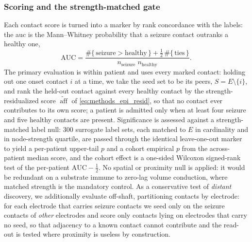 \subsubsection{Scoring and the strength-matched gate}
\label{sssec:methods_epi_gate}
Each contact score is turned into a marker by rank concordance with the labels: the \gls{auc} is the Mann--Whitney probability that a seizure contact outranks a healthy one,
\begin{equation}
    \mathrm{AUC} = \frac{\#\{\,\text{seizure}>\text{healthy}\,\} + \tfrac12\,\#\{\,\text{ties}\,\}}{n_{\text{seizure}}\;n_{\text{healthy}}}.
    \label{eq:methods_epi_auc}
\end{equation}
The primary evaluation is within patient and uses every marked contact: holding out one onset contact \(i\) at a time, we take the seed set to be its peers, \(S = E\setminus\{i\}\), and rank the held-out contact against every healthy contact by the strength-residualized score \(\widetilde{\operatorname{aff}}\) of \eqref{eq:methods_epi_resid}, so that no contact ever contributes to its own score; a patient is admitted only when at least four seizure and five healthy contacts are present. Significance is assessed against a strength-matched label null: \num{300} surrogate label sets, each matched to \(E\) in cardinality and in node-strength quartile, are passed through the identical leave-one-out marker to yield a per-patient upper-tail \(p\) and a cohort empirical \(p\) from the across-patient median score, and the cohort effect is a one-sided Wilcoxon signed-rank test of the per-patient \(\mathrm{AUC}-\tfrac12\). No spatial or proximity null is applied: it would be redundant on a substrate immune to zero-lag volume conduction, where matched strength is the mandatory control. As a conservative test of \emph{distant} discovery, we additionally evaluate off-shaft, partitioning contacts by electrode: for each electrode that carries seizure contacts we seed only on the seizure contacts of \emph{other} electrodes and score only contacts lying on electrodes that carry no seed, so that adjacency to a known contact cannot contribute and the read-out is tested where proximity is useless by construction.


